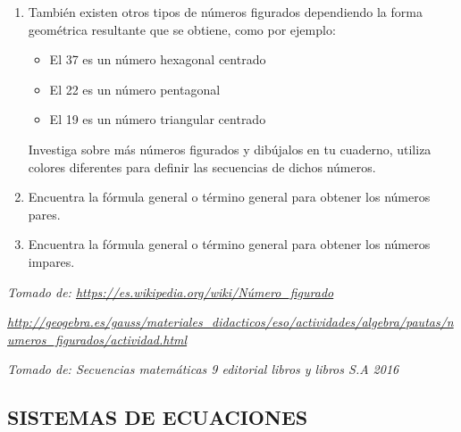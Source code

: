 \documentclass[12pt,a4paper]{article}
\begin{document}
\begin{enumerate}[label=\alph*.]
    \item También existen otros tipos de números figurados dependiendo la forma geométrica resultante que se obtiene, como por ejemplo:

    \begin{itemize}
        \item El 37 es un número hexagonal centrado
        \item El 22 es un número pentagonal
        \item El 19 es un número triangular centrado
    \end{itemize}

    Investiga sobre más números figurados y dibújalos en tu cuaderno, utiliza colores diferentes para definir las secuencias de dichos números.

    \item Encuentra la fórmula general o término general para obtener los números pares.

    \item Encuentra la fórmula general o término general para obtener los números impares.
\end{enumerate}

\textit{Tomado de: \url{https://es.wikipedia.org/wiki/Número_figurado}}

\textit{\url{http://geogebra.es/gauss/materiales_didacticos/eso/actividades/algebra/pautas/numeros_figurados/actividad.html}}

\textit{Tomado de: Secuencias matemáticas 9 editorial libros y libros S.A 2016}

\vspace{1cm}

\subsection*{SISTEMAS DE ECUACIONES}
\end{document}
